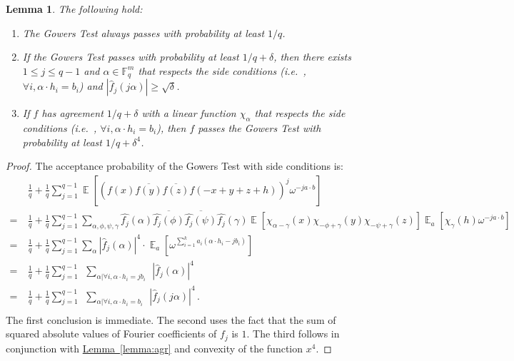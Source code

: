 \documentclass[10pt]{article}
\newtheorem{lemma}[theorem]{Lemma}
\theoremstyle{definition}
\providecommand{\ie}{i.e.\ }
\numberwithin{equation}{section}
\newcommand{\expref}[2]{\texorpdfstring{\hyperref[#2]{#1~\ref{#2}}}{#1~\ref{#2}}}
\newcommand\F{\mathbb{F}}
\DeclareMathOperator*\Exp{\mathbb{E}}
\begin{document}
\begin{lemma}\label{lemma:Gowers} The following hold:
\begin{enumerate}
\item The Gowers Test always passes with probability at least ${1}/{q}$.
\item If the Gowers Test passes with probability at least ${1}/{q}+\delta$, then there
exists $1 \leq j \leq q-1$ and $\alpha \in \F_q^m$ that respects the side conditions (\ie,
$\forall i, \alpha \cdot h_i = b_i$) and $| \widehat{f}_j(j \alpha) | \geq \sqrt{\delta}$.
\item If $f$ has agreement ${1}/{q}+\delta$ with a linear function $\chi_\alpha$ that respects
the side conditions (\ie,
$\forall i, \alpha \cdot h_i = b_i$), then $f$ passes the Gowers Test with probability at least
${1}/{q}+ {\delta^4}$.
\end{enumerate}
\end{lemma}
\begin{proof} The acceptance probability of the Gowers Test with side conditions is:
\begin{align*}
   &  \frac{1}{q} + \frac{1}{q} \sum_{j=1}^{q-1} \Exp \left[ (f(x) \overline{f(y)}\overline{f(z)} f(-x+y+z+h))^j   \omega^{-j a\cdot b} \right] \\
  =\ & \frac{1}{q} + \frac{1}{q}  \sum_{j=1}^{q-1} \sum_{\alpha, \phi, \psi, \gamma}
 \widehat{f_j}(\alpha) \overline{\widehat{f_j}(\phi)} \overline{\widehat{f_j}(\psi)}\widehat{f_j}(\gamma)
  \Exp \left[ \chi_{\alpha - \gamma}(x) \chi_{-\phi + \gamma}(y) \chi_{-\psi + \gamma}(z)    \right]
  \Exp_a \left[ \chi_{\gamma}(h) \omega^{-j a\cdot b}    \right]  \\
  =\ &  \frac{1}{q} + \frac{1}{q}  \sum_{j=1}^{q-1} \sum_\alpha \left| \widehat{f}_j (\alpha)\right|^4
  \cdot \Exp_a \left[ \omega^{\sum_{i=1}^k a_i (\alpha \cdot h_i - j b_i)}  \right] \\
  =\ &  \frac{1}{q} + \frac{1}{q}  \sum_{j=1}^{q-1} \ \  \sum_{\alpha| \forall i, \alpha\cdot h_i = j b_i}
  \ \ \left| \widehat{f}_j (\alpha)\right|^4 \\
   =\ &  \frac{1}{q} + \frac{1}{q}  \sum_{j=1}^{q-1} \ \  \sum_{\alpha| \forall i, \alpha\cdot h_i =  b_i}
  \ \ \left| \widehat{f}_j (j\alpha)\right|^4\,. \\
\end{align*}
The first conclusion is immediate. The second uses the fact that the sum of squared
absolute values of Fourier coefficients of $f_j$ is $1$.
 The third follows in conjunction with \expref{Lemma}{lemma:agr} and convexity of the
 function $x^4$.
\end{proof}
\end{document}
